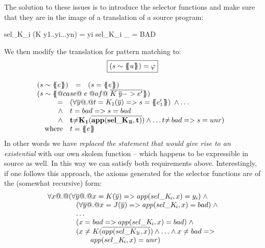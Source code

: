 \documentclass[preprint]{sigplanconf}
\begin{document}
The solution to these issues is to introduce the selector functions and make sure that they are in the 
image of a translation of a source program:
\begin{code}
  sel_K_i (K y1..yi...yn) = yi
  sel_K_i _ = BAD
\end{code}
We then modify the translation for pattern matching to:
\[ \begin{array}{c}
\ruleform{\utrans{\Sigma}{u}{s} = \formula{\phi}} \\ \\
\begin{array}{rcl}
\utrans{\Sigma}{e}{s}
  & = & \formula{(s = \etrans{\Sigma}{\Gamma}{e})} \\
\multicolumn{3}{l}{\utrans{\Sigma}
    {@case@\;e\;@of@\;\ol{K\;\ol{y} -> e'}}{s}} \\
\multicolumn{3}{l}{
\;\;
  \begin{array}[t]{rl}
    = & \formula{(\forall \ol{y} @.@ t = K_1(\ol{y}) => s = \etrans{\Sigma}{\Gamma}{e'_1})\;\land \ldots}  \\
    \land & t = \bad => s = \bad \\
    \land & \formula{{\bf t {\neq}K_1(\ol{\sel{K_1}{i}{t}}})\land\ldots t{\neq}\bad => s=\unr)} \\
    \mbox{where} & t  =  \etrans{\Sigma}{\Gamma}{e}
 \end{array}
}
\end{array}
\end{array}\]
In other words we have {\em replaced the statement that would give rise to an existential} with 
our own skolem function -- which happens to be expressible in source as well. In this way we can 
satisfy both requirements above. Interestingly, if one follows this approach, the axioms generated 
for the selector functions are of the (somewhat recursive) form:
\[\begin{array}{l}
   \forall x @.@ (\forall \overline{y} @.@ x = K(\overline{y}) => \mathop{app(sel\_K\!_{i}, x)} = y_i)\; \land \\
   \qquad\qquad  (\forall \overline{y} @.@ x = J(\overline{y}) => \mathop{app(sel\_K\!_{i}, x)} = \mathop{bad})\; \land \\
   \qquad\qquad \ldots \\ 
   \qquad\qquad (x = \mathop{bad} => \mathop{app(sel\_K\!_{i}, x)} = \mathop{bad})\;\land  \\ 
   \qquad\qquad (x \neq K(\overline{\mathop{app(sel\_K_1\!_{i}, x)}}) \land \ldots \land x \neq \mathop{bad} => \\ 
   \qquad\qquad\qquad \mathop{app(sel\_K\!_{i}, x)} = \mathop{unr})
\end{array}\]
\end{document}
